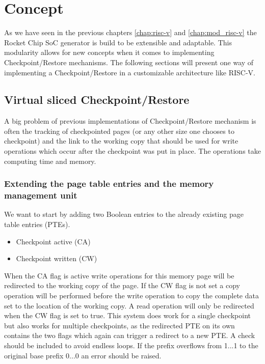 \chapter{Concept}\label{chap:concept}
As we have seen in the previous chapters \ref{chap:risc-v} and
\ref{chap:mod_risc-v} the Rocket Chip SoC generator is build
to be extensible and adaptable.
This modularity allows for new concepts when it comes to implementing
Checkpoint/Restore mechanisms.
The following sections will present one
way of implementing a Checkpoint/Restore in
a customizable architecture like RISC-V.

\section{Virtual sliced Checkpoint/Restore}
A big problem of previous implementations of
Checkpoint/Restore mechanism is often the tracking of checkpointed
pages (or any other size one chooses to checkpoint) and the link
to the working copy that should be used for write operations
which occur after the checkpoint was put in place.
The operations take computing time and memory.

\subsection{Extending the page table entries and the memory management unit}
We want to start by adding two Boolean entries
to the already existing page table entries (PTEs).
\begin{itemize}
    \item Checkpoint active (CA)
    \item Checkpoint written (CW)
\end{itemize}
When the CA flag is active write operations for this memory
page will be redirected to the working copy of the page.
If the CW flag is not set a copy operation will be performed
before the write operation to copy the complete data set to
the location of the working copy.
A read operation will only be redirected when the CW flag
is set to true.
This system does work for a single checkpoint but also works
for multiple checkpoints, as the redirected PTE on its own contains
the two flags which again can trigger a redirect to a new PTE.
A check should be included to avoid endless loops.
If the prefix overflows from 1...1 to the original base
prefix 0...0 an error should be raised.

